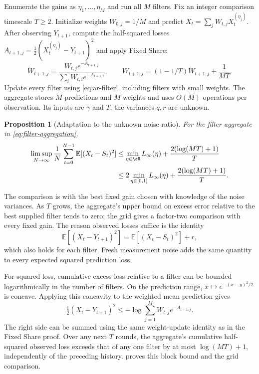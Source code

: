 \documentclass[11pt,twoside]{article}
\newcommand{\E}{\mathbb E}
\newtheorem{proposition}[theorem]{Proposition}
\theoremstyle{definition}
\theoremstyle{remark}
\begin{document}
Enumerate the gains as $\eta_1,\ldots,\eta_M$ and run all $M$ filters.
Fix an integer comparison timescale $T\ge2$. Initialize weights
$W_{0,j}=1/M$ and predict $X_t=\sum_jW_{t,j}X_t^{(\eta_j)}$.
After observing $Y_{t+1}$, compute the half-squared losses
$A_{t+1,j}=\tfrac12(X_t^{(\eta_j)}-Y_{t+1})^2$ and apply Fixed Share:
\begin{equation}
 \widetilde W_{t+1,j}
 =\frac{W_{t,j}e^{-A_{t+1,j}}}{\sum_iW_{t,i}e^{-A_{t+1,i}}},\qquad
 W_{t+1,j}=(1-1/T)\widetilde W_{t+1,j}+\frac1{MT}.
 \label{eq:filter-aggregation}
\end{equation}
Update every filter using \cref{eq:ar-filter}, including filters with small
weights. The aggregate stores $M$ predictions and $M$ weights and uses
$O(M)$ operations per observation. Its inputs are $\gamma$ and $T$;
the variances $q,r$ are unknown.

\begin{proposition}[Adaptation to the unknown noise ratio]
\label{ex:filter-aggregation}
For the filter aggregate in \cref{eq:filter-aggregation},
\begin{equation}
 \begin{aligned}
 \limsup_{N\to\infty}\frac1N\sum_{t=0}^{N-1}\E[(X_t-S_t)^2]
 &\le \min_{\eta\in\cH}L_\infty(\eta)+\frac{2(\log(MT)+1)}T\\
 &\le 2\min_{\eta\in[0,1]}L_\infty(\eta)+\frac{2(\log(MT)+1)}T.
 \end{aligned}
 \label{eq:filter-oracle}
\end{equation}
\end{proposition}

The comparison is with the best fixed gain chosen with knowledge of the
noise variances. As $T$ grows, the aggregate's upper bound on excess error
relative to the best supplied filter tends to zero; the grid gives a
factor-two comparison with every fixed gain. The reason observed losses
suffice is the identity
\[
 \E[(X_t-Y_{t+1})^2]=\E[(X_t-S_t)^2]+r,
\]
which also holds for each filter. Fresh measurement noise adds the same
quantity to every expected squared prediction loss.

For squared loss, cumulative excess loss relative to a filter can be
bounded logarithmically in the number of filters. On the prediction range,
$x\mapsto e^{-(x-y)^2/2}$ is concave. Applying this concavity to the
weighted mean prediction gives
\[
 \tfrac12(X_t-Y_{t+1})^2
 \le -\log\sum_{j=1}^M W_{t,j}e^{-A_{t+1,j}}.
\]
The right side can be summed using the same weight-update identity as in
the Fixed Share proof. Over any next $T$ rounds, the aggregate's cumulative
half-squared observed loss exceeds that of any one filter by at most
$\log(MT)+1$, independently of the preceding history.
 proves this block bound and the grid comparison.
\end{document}
